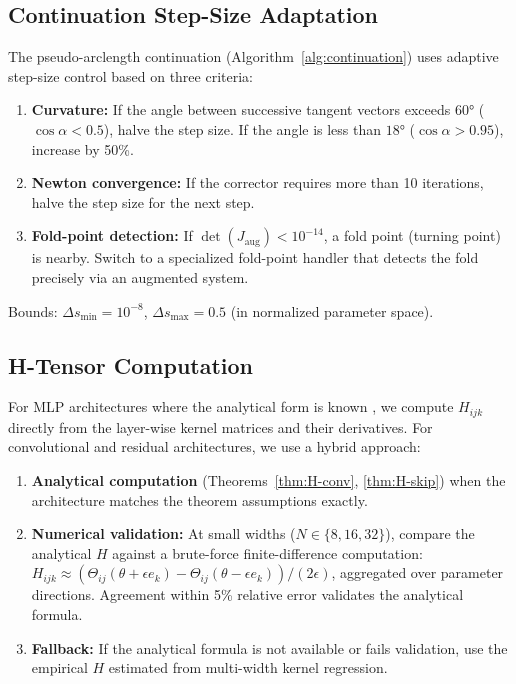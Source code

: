 \documentclass[11pt]{article}
\theoremstyle{definition}
\renewcommand{\Theta}{\varTheta}
\begin{document}
\subsection{Continuation Step-Size Adaptation}

The pseudo-arclength continuation (Algorithm~\ref{alg:continuation}) uses adaptive step-size control based on three criteria:

\begin{enumerate}[leftmargin=*]
\item \textbf{Curvature:} If the angle between successive tangent vectors exceeds $60°$ ($\cos\alpha < 0.5$), halve the step size. If the angle is less than $18°$ ($\cos\alpha > 0.95$), increase by 50\%.
\item \textbf{Newton convergence:} If the corrector requires more than 10 iterations, halve the step size for the next step.
\item \textbf{Fold-point detection:} If $\det(J_{\mathrm{aug}}) < 10^{-14}$, a fold point (turning point) is nearby. Switch to a specialized fold-point handler that detects the fold precisely via an augmented system.
\end{enumerate}

Bounds: $\Delta s_{\min} = 10^{-8}$, $\Delta s_{\max} = 0.5$ (in normalized parameter space).

\subsection{H-Tensor Computation}

For MLP architectures where the analytical form is known \citep{dyer2020asymptotics}, we compute $H_{ijk}$ directly from the layer-wise kernel matrices and their derivatives. For convolutional and residual architectures, we use a hybrid approach:

\begin{enumerate}[leftmargin=*]
\item \textbf{Analytical computation} (Theorems~\ref{thm:H-conv}, \ref{thm:H-skip}) when the architecture matches the theorem assumptions exactly.
\item \textbf{Numerical validation:} At small widths ($N \in \{8, 16, 32\}$), compare the analytical $H$ against a brute-force finite-difference computation: $H_{ijk} \approx (\Theta_{ij}(\theta + \epsilon e_k) - \Theta_{ij}(\theta - \epsilon e_k)) / (2\epsilon)$, aggregated over parameter directions. Agreement within 5\% relative error validates the analytical formula.
\item \textbf{Fallback:} If the analytical formula is not available or fails validation, use the empirical $H$ estimated from multi-width kernel regression.
\end{enumerate}
\end{document}
